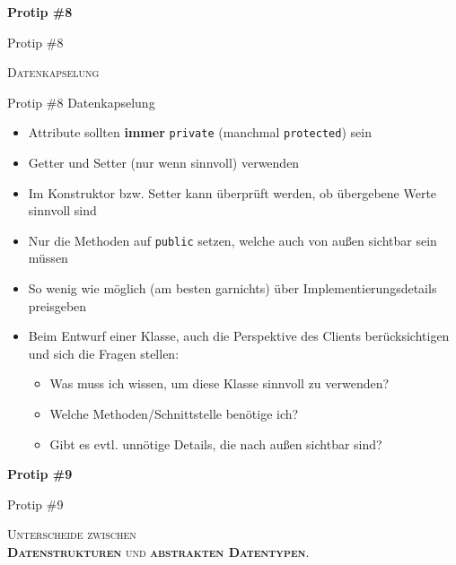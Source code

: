 \documentclass[18pt]{beamer}
\begin{document}
\begin{frame}{\quad}
    \center
    \Huge{\textbf{Protip \#8}}
\end{frame}

\begin{frame}{Protip \#8}
    \begin{block}{}
        \center
        \textsc{Datenkapselung}
    \end{block}
\end{frame}

\begin{frame}{Protip \#8 Datenkapselung}
    \begin{itemize}
        \item Attribute sollten \textbf{immer} \texttt{private} (manchmal \texttt{protected}) sein
        \item Getter und Setter (nur wenn sinnvoll) verwenden
        \item Im Konstruktor bzw. Setter kann überprüft werden, ob übergebene Werte sinnvoll sind
        \item Nur die Methoden auf \texttt{public} setzen, welche auch von außen sichtbar sein müssen
        \item So wenig wie möglich (am besten garnichts) über Implementierungsdetails preisgeben
        \item Beim Entwurf einer Klasse, auch die Perspektive des Clients berücksichtigen und sich die Fragen stellen:\\
        \begin{itemize}
            \item Was muss ich wissen, um diese Klasse sinnvoll zu verwenden?
            \item Welche Methoden/Schnittstelle benötige ich?
            \item Gibt es evtl. unnötige Details, die nach außen sichtbar sind?
        \end{itemize}

    \end{itemize}
\end{frame}

\begin{frame}{\quad}
    \center
    \Huge{\textbf{Protip \#9}}
\end{frame}

\begin{frame}{Protip \#9}
    \begin{block}{}
        \center
        \textsc{Unterscheide zwischen\\ \textbf{Datenstrukturen} und \textbf{abstrakten Datentypen}.}
    \end{block}
\end{frame}
\end{document}
